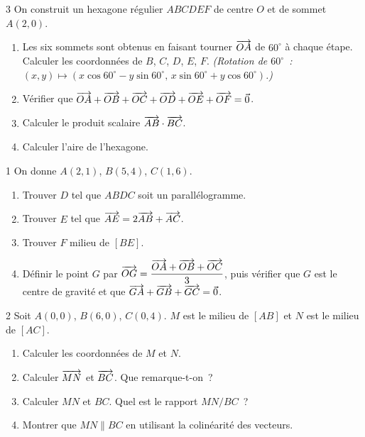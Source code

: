 \begin{probleme}{3}
On construit un hexagone r\'egulier $ABCDEF$ de centre $O$ et de sommet
$A(2,0)$.
\begin{enumerate}
  \item Les six sommets sont obtenus en faisant tourner $\overrightarrow{OA}$
        de $60^{\circ}$ \`a chaque \'etape. Calculer les coordonn\'ees de
        $B$, $C$, $D$, $E$, $F$.
        \emph{(Rotation de $60^{\circ}$~: $(x,y)\mapsto(x\cos60^{\circ}-y\sin60^{\circ},\,x\sin60^{\circ}+y\cos60^{\circ})$.)}
  \item V\'erifier que $\overrightarrow{OA}+\overrightarrow{OB}+\overrightarrow{OC}+\overrightarrow{OD}+\overrightarrow{OE}+\overrightarrow{OF}=\vec{0}$.
  \item Calculer le produit scalaire $\overrightarrow{AB}\cdot\overrightarrow{BC}$.
  \item Calculer l'aire de l'hexagone.
\end{enumerate}
\end{probleme}

\begin{probleme}{1}
On donne $A(2,1)$, $B(5,4)$, $C(1,6)$.
\begin{enumerate}
  \item Trouver $D$ tel que $ABDC$ soit un parall\'elogramme.
  \item Trouver $E$ tel que $\overrightarrow{AE} = 2\overrightarrow{AB} + \overrightarrow{AC}$.
  \item Trouver $F$ milieu de $[BE]$.
  \item Définir le point $G$ par
        $\overrightarrow{OG}=\dfrac{\overrightarrow{OA}+\overrightarrow{OB}+\overrightarrow{OC}}{3}$, puis vérifier que $G$
        est le centre de gravité et
        que $\overrightarrow{GA}+\overrightarrow{GB}+\overrightarrow{GC}=\vec{0}$.
\end{enumerate}
\end{probleme}

\begin{probleme}{2}
Soit $A(0,0)$, $B(6,0)$, $C(0,4)$. $M$ est le milieu de $[AB]$
et $N$ est le milieu de $[AC]$.
\begin{enumerate}
  \item Calculer les coordonn\'ees de $M$ et $N$.
  \item Calculer $\overrightarrow{MN}$ et $\overrightarrow{BC}$.
        Que remarque-t-on~?
  \item Calculer $MN$ et $BC$.
        Quel est le rapport $MN/BC$~?
  \item Montrer que $MN\parallel BC$ en utilisant la colin\'earit\'e des vecteurs.
\end{enumerate}
\end{probleme}

